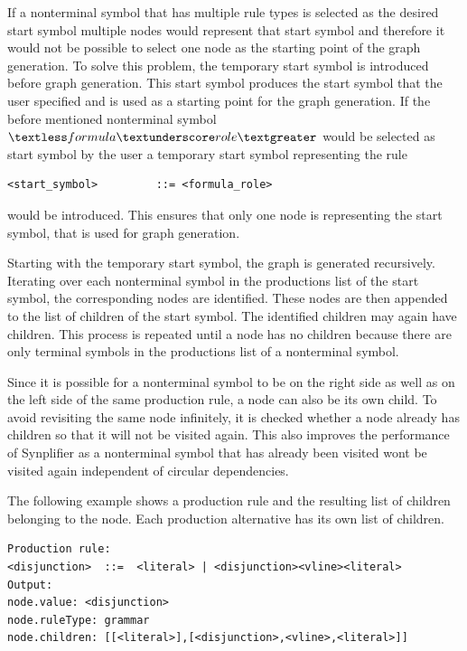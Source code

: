 If a nonterminal symbol that has multiple rule types is selected as the desired start symbol multiple nodes would represent that start symbol and therefore it would not be possible to select one node as the starting point of the graph generation.
To solve this problem, the temporary start symbol is introduced before graph generation.
This start symbol produces the start symbol that the user specified and is used as a starting point for the graph generation.
If the before mentioned nonterminal symbol $\textless formula\textunderscore role\textgreater$ would be selected as start symbol by the user a temporary start symbol representing the rule
\begin{verbatim}
<start_symbol>         ::= <formula_role>
\end{verbatim}
would be introduced.
This ensures that only one node is representing the start symbol, that is used for graph generation.

Starting with the temporary start symbol, the graph is generated recursively. Iterating over each nonterminal symbol in the productions list of the start symbol, the corresponding nodes are identified. These nodes are then appended to the list of children of the start symbol. The identified children may again have children. This process is repeated until a node has no children because there are only terminal symbols in the productions list of a nonterminal symbol.

Since it is possible for a nonterminal symbol to be on the right side as well as on the left side of the same production rule, a node can also be its own child. To avoid revisiting the same node infinitely, it is checked whether a node already has children so that it will not be visited again. This also improves the performance of \ac{Synplifier} as a nonterminal symbol that has already been visited wont be visited again independent of circular dependencies.

The following example shows a production rule and the resulting list of children belonging to the node. Each production alternative has its own list of children. %
\begin{verbatim}
Production rule:
<disjunction>  ::=  <literal> | <disjunction><vline><literal>
Output:
node.value: <disjunction>
node.ruleType: grammar
node.children: [[<literal>],[<disjunction>,<vline>,<literal>]]
\end{verbatim}

